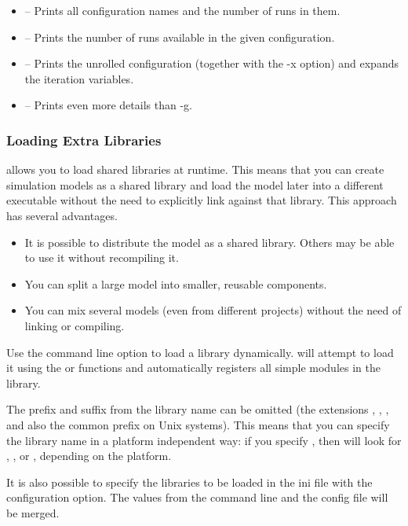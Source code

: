 \begin{itemize}
  \item {} -- Prints all configuration names and the number of runs in them.
  \item {} -- Prints the number of runs available in the given configuration.
  \item {} -- Prints the unrolled configuration (together with the -x option) and
                    expands the iteration variables.
  \item {} -- Prints even more details than -g.
\end{itemize}


\subsubsection{Loading Extra Libraries}

{\opp} allows you to load shared libraries at runtime. This means that you can create
simulation models as a shared library and load the model later into a different executable without
the need to explicitly link against that library. This approach has several advantages.

\begin{itemize}
  \item It is possible to distribute the model as a shared library. Others may be able to use
  it without recompiling it.
  \item You can split a large model into smaller, reusable components.
  \item You can mix several models (even from different projects)
    without the need of linking or compiling.
\end{itemize}

Use the  command line option to load a library dynamically.
{\opp} will attempt to load it using the  or  functions and
automatically registers all simple modules in the library.

The prefix and suffix from the library name can be omitted (the extensions
, , , and also the common  prefix
on Unix systems). This means that you can specify the library name in a
platform independent way: if you specify , then {\opp} will
look for , ,  or ,
depending on the platform.

It is also possible to specify the libraries to be loaded in the ini file
with the  configuration option. The values from the command line
and the config file will be merged.

